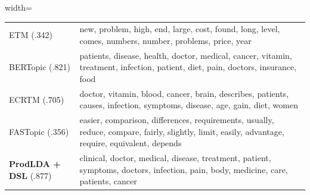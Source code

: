 \documentclass{article}
\theoremstyle{plain}
\theoremstyle{definition}
\theoremstyle{remark}
\begin{document}
\begin{table}[t]
\begin{adjustbox}{width=\linewidth}
\begin{tabular}{@{}l l@{}}
{\tiny ETM (.342)} & \textcolor{green!60!black}{new}, \textcolor{black!70}{problem}, \textcolor{green!90!black}{high}, \textcolor{black!40}{end}, \textcolor{green!90!black}{large}, \textcolor{green!60!black}{cost}, \textcolor{black!40}{found}, \textcolor{black!40}{long}, \textcolor{green!40!black}{level}, \textcolor{black!70}{comes}, \textcolor{black!70}{numbers}, \textcolor{green!60!black}{number}, \textcolor{green!40!black}{problems}, \textcolor{green!90!black}{price}, \textcolor{green!40!black}{year} \\
{\tiny BERTopic (.821)} & \textcolor{green!90!black}{patients}, \textcolor{green!60!black}{disease}, \textcolor{green!40!black}{health}, \textcolor{green!60!black}{doctor}, \textcolor{green!90!black}{medical}, \textcolor{green!40!black}{cancer}, \textcolor{black!70}{vitamin}, \textcolor{green!60!black}{treatment}, \textcolor{black!40}{infection}, \textcolor{green!90!black}{patient}, \textcolor{black!70}{diet}, \textcolor{black!70}{pain}, \textcolor{green!40!black}{doctors}, \textcolor{black!40}{insurance}, \textcolor{black!40}{food} \\
{\tiny ECRTM (.705)} & \textcolor{green!60!black}{doctor}, \textcolor{green!40!black}{vitamin}, \textcolor{green!40!black}{blood}, \textcolor{green!60!black}{cancer}, \textcolor{black!40}{brain}, \textcolor{black!40}{describes}, \textcolor{green!90!black}{patients}, \textcolor{green!40!black}{causes}, \textcolor{black!70}{infection}, \textcolor{green!90!black}{symptoms}, \textcolor{green!60!black}{disease}, \textcolor{black!70}{age}, \textcolor{black!40}{gain}, \textcolor{green!90!black}{diet}, \textcolor{black!70}{women} \\
{\tiny FASTopic (.356)} & \textcolor{green!40!black}{easier}, \textcolor{black!40}{comparison}, \textcolor{green!60!black}{differences}, \textcolor{green!40!black}{requirements}, \textcolor{green!90!black}{usually}, \textcolor{black!70}{reduce}, \textcolor{black!70}{compare}, \textcolor{green!60!black}{fairly}, \textcolor{green!90!black}{slightly}, \textcolor{green!60!black}{limit}, \textcolor{black!40}{easily}, \textcolor{green!40!black}{advantage}, \textcolor{green!90!black}{require}, \textcolor{black!70}{equivalent}, \textcolor{black!40}{depends} \\
{\tiny \textbf{ProdLDA + DSL} (.877)} & \textcolor{green!90!black}{clinical}, \textcolor{green!60!black}{doctor}, \textcolor{green!60!black}{medical}, \textcolor{green!40!black}{disease}, \textcolor{green!60!black}{treatment}, \textcolor{green!90!black}{patient}, \textcolor{green!40!black}{symptoms}, \textcolor{black!70}{doctors}, \textcolor{green!40!black}{infection}, \textcolor{black!40}{pain}, \textcolor{black!40}{body}, \textcolor{black!70}{medicine}, \textcolor{black!40}{care}, \textcolor{green!90!black}{patients}, \textcolor{black!70}{cancer} \\

\end{tabular}
\end{adjustbox}
\end{table}
\end{document}
